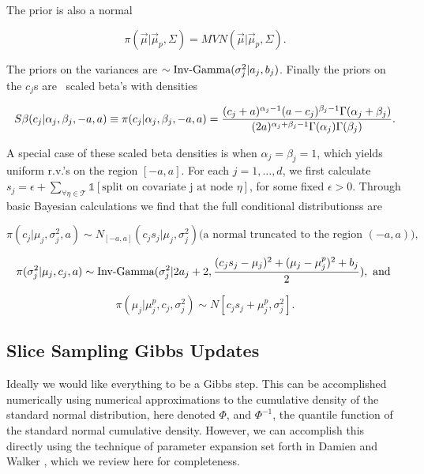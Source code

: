  The prior is also a normal 
 
 \begin{equation}
 \pi(\vec{\mu}\vert \vec{\mu}_p, \Sigma)=MVN(\vec{\mu}\vert \vec{\mu}_p, \Sigma).
 \end{equation}

The priors on the variances are \iid $\sim \text{Inv-Gamma}({\sigma_j^2}\vert{a_j},{b_j})$.
Finally the priors on the $c_j$s are \iid\ scaled beta's with densities 

\begin{equation}\newnot{symbol:scaled_beta}
S\beta(c_j\vert \alpha_j, \beta_j, -a, a)\equiv\pi(c_j\vert \alpha_j, \beta_j, -a, a)= \frac{(c_j+a)^{\alpha_j-1}(a-c_j)^{\beta_j-1}\Gamma(\alpha_j+\beta_j)}{(2a)^{\alpha_j+\beta_j-1}\Gamma(\alpha_j)\Gamma(\beta_j)}.
\end{equation}

A special case of these scaled beta densities is when $\alpha_j=\beta_j=1$, which yields uniform r.v.'s on the region  $[-a,a]$. 
For each $j=1, \dots, d$, we first calculate $s_j = \epsilon+\sum_{\forall \eta \in \mathcal{T}}\mathds{1}[\text{split on covariate j at node $\eta$}]$, for some fixed $\epsilon>0$.
Through basic Bayesian calculations we find that the full conditional distributionss are 

\begin{equation}
\pi(c_j\vert \mu_j, \sigma_j^2, a) \sim N_{[-a,a]}(c_js_j\vert \mu_j, \sigma^2_j) \text{(a normal truncated to the region $(-a,a)$),}
\end{equation}

\begin{equation}
\pi(\sigma^2_j \vert \mu_j, c_j, a) \sim \text{Inv-Gamma}({\sigma_j^2}\vert{2a_j+2},{\frac{(c_js_j-\mu_j)^2+ (\mu_j-\mu_j^p)^2+b_j}{2}}), \text{ and } 
\end{equation}

\begin{equation}
\pi(\mu_j\vert \mu_j^p, c_j, \sigma^2_j)\sim N[c_js_j+\mu_j^p, \sigma_j^2].
\end{equation}

\subsection{Slice Sampling Gibbs Updates}

Ideally we would like everything to be a Gibbs step. This can be accomplished numerically using numerical approximations to the cumulative density of the standard normal distribution, here denoted $\Phi$, and $\Phi^{-1}$, the quantile function of the standard normal cumulative density.  However, we can accomplish this directly using the technique of parameter expansion set forth in Damien and Walker \cite{damien2001sampling}, which we review here for completeness. 
 
